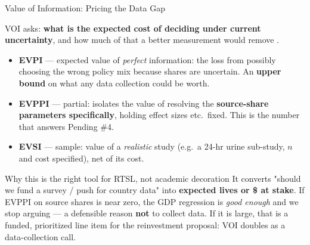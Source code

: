 \documentclass[
  11pt,
  ignorenonframetext,
  aspectratio=169]{beamer}
\begin{document}
\begin{frame}{Value of Information: Pricing the Data Gap}
\label{value-of-information-pricing-the-data-gap}
\justifying
\footnotesize

VOI asks:
\textbf{what is the expected cost of deciding under current uncertainty},
and how much of that a better measurement would remove
\autocite{wilson2015voi}.

\medskip
\begin{itemize}
  \item \textbf{EVPI} --- expected value of \emph{perfect} information: the loss from possibly choosing the wrong policy mix because shares are uncertain. An \textbf{upper bound} on what any data collection could be worth.
  \item \textbf{EVPPI} --- partial: isolates the value of resolving the \textbf{source-share parameters specifically}, holding effect sizes etc.\ fixed. This is the number that answers Pending \#4.
  \item \textbf{EVSI} --- sample: value of a \emph{realistic} study (e.g.\ a 24-hr urine sub-study, $n$ and cost specified), net of its cost.
\end{itemize}

\medskip
\begin{exampleblock}{Why this is the right tool for RTSL, not academic decoration}
\footnotesize
It converts "should we fund a survey / push for country data" into \textbf{expected lives or \$ at stake}. If EVPPI on source shares is near zero, the GDP regression is \emph{good enough} and we stop arguing --- a defensible reason \textbf{not} to collect data. If it is large, that is a funded, prioritized line item for the reinvestment proposal: VOI doubles as a data-collection call.
\end{exampleblock}
\end{frame}
\end{document}
